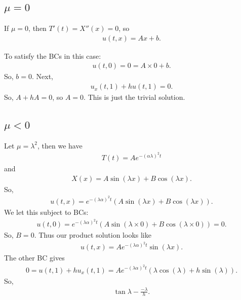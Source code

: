 \documentclass{article}
\theoremstyle{definition}
\begin{document}
\subsection{$\mu=0$}
If $\mu = 0$, then $T'(t) = X''(x) = 0$, so
\begin{align*}
u(t,x) = Ax+b.
\end{align*}

To satisfy the BCs in this case:
\begin{align*}
u(t,0) = 0 = A\times 0 + b.
\end{align*}
So, $b=0$. Next,
\begin{align*}
u_x(t,1) + hu(t,1) = 0.
\end{align*}
So, $A+hA = 0$, so $A=0$. This is just the trivial solution.

\subsection{$\mu <0$}
Let $\mu=\lambda^2$, then we have
\begin{align*}
T(t) = Ae^{-(\alpha \lambda)^2t}
\end{align*}
and
\begin{align*}
X(x) = A\sin(\lambda x) + B\cos(\lambda x).
\end{align*}
So,
\begin{align*}
u(t,x) = e^{-(\lambda\alpha)^2t}\left( A\sin(\lambda x) + B\cos(\lambda x) \right).
\end{align*}
We let this subject to BCs:
\begin{align*}
u(t,0) = e^{-(\lambda\alpha)^2t}\left( A\sin(\lambda\times 0) + B\cos(\lambda \times 0) \right) = 0.
\end{align*}
So, $B=0$. Thus our product solution looks like
\begin{align*}
u(t,x) = Ae^{-(\lambda\alpha)^2t}\sin(\lambda x).
\end{align*}
The other BC gives
\begin{align*}
0=u(t,1)+hu_x(t,1)=Ae^{-(\lambda\alpha)^2t}\left( \lambda\cos(\lambda) + h\sin(\lambda) \right).
\end{align*}
So,
\begin{align*}
\tan\lambda - \frac{-\lambda}{h}.
\end{align*}
\end{document}
